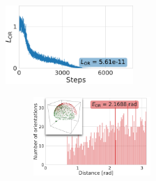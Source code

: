 \begin{figure}[ht!]
    \begin{minipage}[t]{0.30\linewidth}
        \centering
        \includegraphics[height=3cm]{figures/5a1a_quartercov_uniformS2_perfect_ar_aa}
        \caption{%
            Example of perfect orientation recovery (for \texttt{5a1a}).
            The loss $L_\text{OR}$  converges to zero when the distance estimation is perfect, \ie, $\widehat{d_p}(\p_i, \p_j) = d_q(q_i, q_j)$.
        }\label{fig:5j0n-orientation-recovery-loss}
    \end{minipage}
    \hfill
    \begin{minipage}[t]{0.66\linewidth}
        \begin{subfigure}[t]{0.49\linewidth}
            \centering
            \includegraphics[height=3cm]{figures/BeforeAA.pdf}

\end{subfigure}
\end{minipage}
\end{figure}
